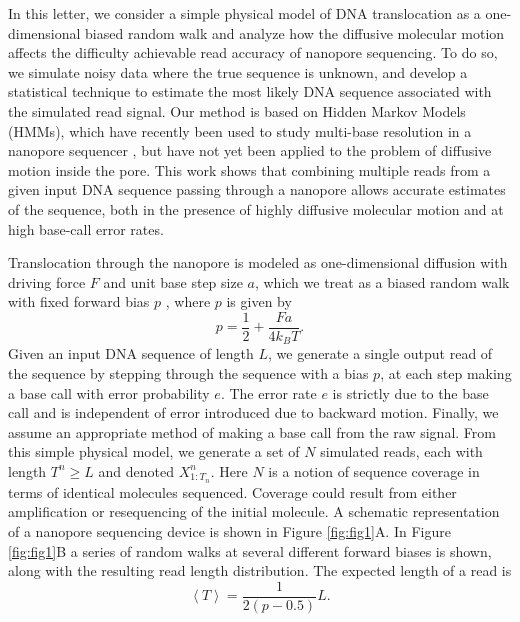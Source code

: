 \documentclass{biophys_letter}
\begin{document}
In this letter, we consider a simple physical model of DNA translocation as a one-dimensional biased random walk and analyze how the diffusive molecular motion affects the difficulty achievable read accuracy of nanopore sequencing.
To do so, we simulate noisy data where the true sequence is unknown, and develop a statistical technique to estimate the most likely DNA sequence associated with the simulated read signal.
Our method is based on Hidden Markov Models (HMMs), which have recently been used to study multi-base resolution in a nanopore sequencer \cite{Timp:2012}, but have not yet been applied to the problem of diffusive motion inside the pore.
This work shows that combining multiple reads from a given input DNA sequence passing through a nanopore allows accurate estimates of the sequence, both in the presence of highly diffusive molecular motion and at high base-call error rates.

Translocation through the nanopore is modeled as one-dimensional diffusion with driving force $F$ and unit base step size $a$, which we treat as a biased random walk with fixed forward bias $p$ \cite{Berg:1993}, where $p$ is given by
\begin{equation}
p = \frac{1}{2} + \frac{Fa}{4k_{B}T}.
\end{equation}
Given an input DNA sequence of length $L$, we generate a single output read of the sequence by stepping through the sequence with a bias $p$, at each step making a base call with error probability $e$.
The error rate $e$ is strictly due to the base call and is independent of error introduced due to backward motion. 
Finally, we assume an appropriate method of making a base call from the raw signal.
From this simple physical model, we generate a set of $N$ simulated reads, each with length $T^{n} \ge L$ and denoted $X^n_{1:T_n}$.
Here $N$ is a notion of sequence coverage in terms of identical molecules sequenced.
Coverage could result from either amplification or resequencing of the initial molecule.
A schematic representation of a nanopore sequencing device is shown in Figure \ref{fig:fig1}A.
In Figure \ref{fig:fig1}B a series of random walks at several different forward biases is shown, along with the resulting read length distribution.
The expected length of a read is 
\begin{equation}
  \left\langle T  \right\rangle = \frac{1}{2(p-0.5)} L.
\end{equation}
\end{document}
